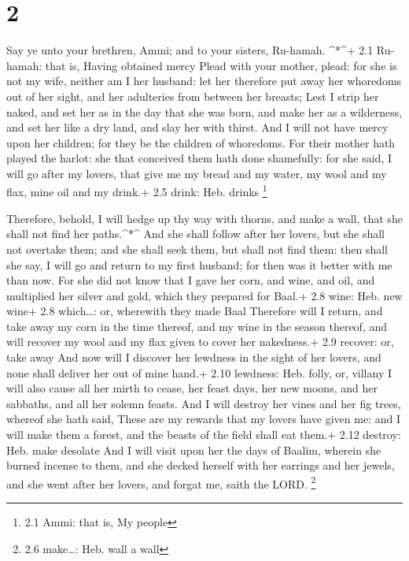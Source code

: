 \hypertarget{section-1}{%
\section{2}\label{section-1}}

 Say ye unto your brethren, Ammi; and to your sisters,
Ru-hamah. \^{}*\^{}+ 2.1 Ru-hamah: that is, Having obtained mercy
 Plead with your mother, plead: for she is not my wife,
neither am I her husband: let her therefore put away her whoredoms out
of her sight, and her adulteries from between her breasts; 
Lest I strip her naked, and set her as in the day that she was born, and
make her as a wilderness, and set her like a dry land, and slay her with
thirst.  And I will not have mercy upon her children; for
they be the children of whoredoms.  For their mother hath
played the harlot: she that conceived them hath done shamefully: for she
said, I will go after my lovers, that give me my bread and my water, my
wool and my flax, mine oil and my drink.+ 2.5 drink: Heb. drinks
\footnote{2.1 Ammi: that is, My people}

 Therefore, behold, I will hedge up thy way with thorns, and
make a wall, that she shall not find her paths.\^{}*\^{} 
And she shall follow after her lovers, but she shall not overtake them;
and she shall seek them, but shall not find them: then shall she say, I
will go and return to my first husband; for then was it better with me
than now.  For she did not know that I gave her corn, and
wine, and oil, and multiplied her silver and gold, which they prepared
for Baal.+ 2.8 wine: Heb. new wine+ 2.8 which\ldots: or, wherewith they
made Baal  Therefore will I return, and take away my corn in
the time thereof, and my wine in the season thereof, and will recover my
wool and my flax given to cover her nakedness.+ 2.9 recover: or, take
away  And now will I discover her lewdness in the sight of
her lovers, and none shall deliver her out of mine hand.+ 2.10 lewdness:
Heb. folly, or, villany  I will also cause all her mirth to
cease, her feast days, her new moons, and her sabbaths, and all her
solemn feasts.  And I will destroy her vines and her fig
trees, whereof she hath said, These are my rewards that my lovers have
given me: and I will make them a forest, and the beasts of the field
shall eat them.+ 2.12 destroy: Heb. make desolate  And I
will visit upon her the days of Baalim, wherein she burned incense to
them, and she decked herself with her earrings and her jewels, and she
went after her lovers, and forgat me, saith the LORD. \footnote{2.6
  make\ldots: Heb. wall a wall}

